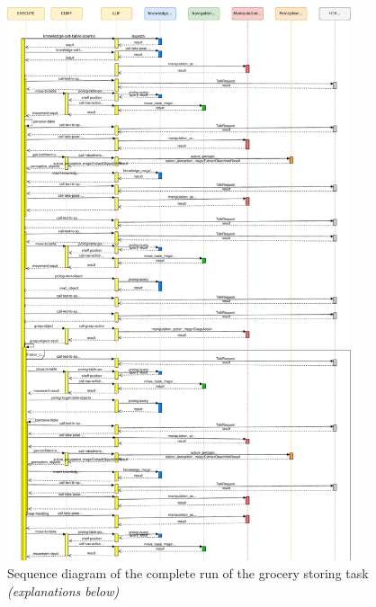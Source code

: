 \documentclass[main.tex]{subfiles}
\begin{document}
		\begin{figure}[H]
			\centering
			\includegraphics[width=0.9\textwidth]{pictures/diagramms/grocery_01_seq}
			\caption{Sequence diagram of the complete run of the grocery storing task \textit{(explanations below)}}
			\label{grocery_seq_01}
		\end{figure}
\end{document}
